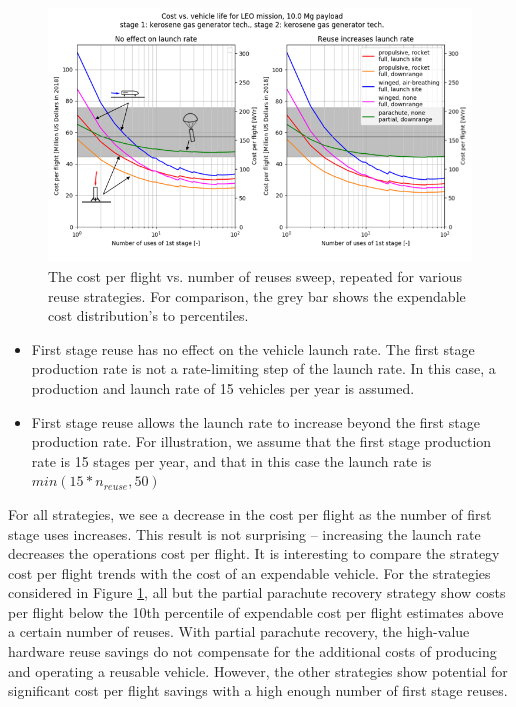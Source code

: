 \documentclass[conf]{new-aiaa}
\begin{document}
\begin{multicols}{2}
\begin{figure}
    \centering
    \includegraphics[width=\textwidth]{n_reuse_sweep_LEO_kerosene_annotated}
    \caption{\label{fig:num_reuse_sweep_LEO_kerosene} The cost per flight vs. number of reuses sweep, repeated for various reuse strategies. For comparison, the grey bar shows the expendable cost distribution's  to  percentiles.}
\end{figure}

\begin{itemize}
  \item First stage reuse has no effect on the vehicle launch rate. The first stage production rate is not a rate-limiting step of the launch rate. In this case, a production and launch rate of 15 vehicles per year is assumed. 
  \item First stage reuse allows the launch rate to increase beyond the first stage production rate. For illustration, we assume that the first stage production rate is 15 stages per year, and that in this case the launch rate is $min(15 * n_{reuse}, 50)$
\end{itemize}


For all strategies, we see a decrease in the cost per flight as the number of first stage uses increases. This result is not surprising -- increasing the launch rate decreases the operations cost per flight. It is interesting to compare the strategy cost per flight trends with the cost of an expendable vehicle. For the strategies considered in Figure \ref{fig:num_reuse_sweep_LEO_kerosene}, all but the partial parachute recovery strategy show costs per flight below the 10th percentile of expendable cost per flight estimates above a certain number of reuses. With partial parachute recovery, the high-value hardware reuse savings do not compensate for the additional costs of producing and operating a reusable vehicle. However, the other strategies show potential for significant cost per flight savings with a high enough number of first stage reuses. 


\end{multicols}
\end{document}
